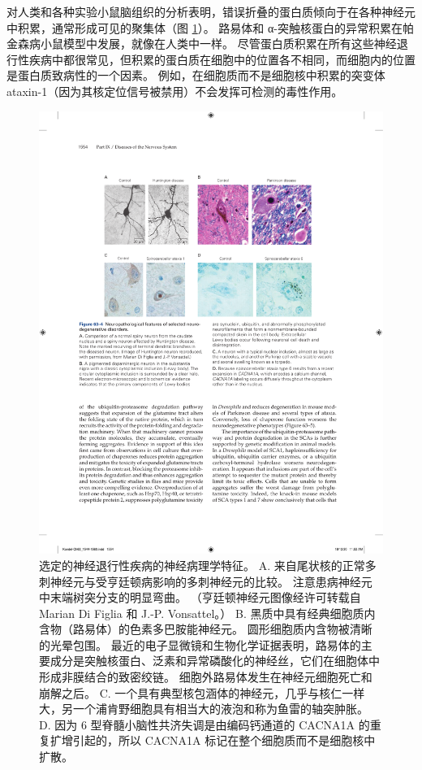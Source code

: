 对人类和各种实验小鼠脑组织的分析表明，错误折叠的蛋白质倾向于在各种神经元中积累，通常形成可见的聚集体（图 \ref{fig:63_4}）。 
路易体和 α-突触核蛋白的异常积累在帕金森病小鼠模型中发展，就像在人类中一样。 尽管蛋白质积累在所有这些神经退行性疾病中都很常见，但积累的蛋白质在细胞中的位置各不相同，而细胞内的位置是蛋白质致病性的一个因素。 例如，在细胞质而不是细胞核中积累的突变体 ataxin-1（因为其核定位信号被禁用）不会发挥可检测的毒性作用。

\begin{figure}[htbp]
	\centering
	\includegraphics[width=0.8\linewidth]{chap63/fig_63_4}
	\caption{选定的神经退行性疾病的神经病理学特征。 A. 来自尾状核的正常多刺神经元与受亨廷顿病影响的多刺神经元的比较。 注意患病神经元中末端树突分支的明显弯曲。 （亨廷顿神经元图像经许可转载自 Marian Di Figlia 和 J.-P. Vonsattel。） B. 黑质中具有经典细胞质内含物（路易体）的色素多巴胺能神经元。 圆形细胞质内含物被清晰的光晕包围。 最近的电子显微镜和生物化学证据表明，路易体的主要成分是突触核蛋白、泛素和异常磷酸化的神经丝，它们在细胞体中形成非膜结合的致密绞链。 细胞外路易体发生在神经元细胞死亡和崩解之后。 C. 一个具有典型核包涵体的神经元，几乎与核仁一样大，另一个浦肯野细胞具有相当大的液泡和称为鱼雷的轴突肿胀。 D. 因为 6 型脊髓小脑性共济失调是由编码钙通道的 CACNA1A 的重复扩增引起的，所以 CACNA1A 标记在整个细胞质而不是细胞核中扩散。}
	\label{fig:63_4}
\end{figure}

